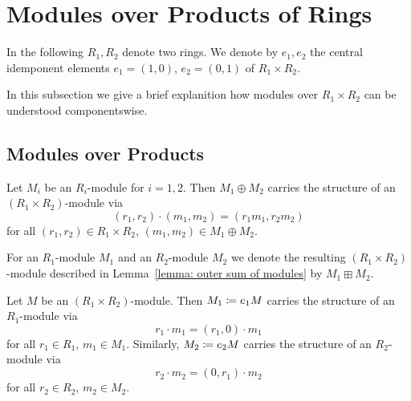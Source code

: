 \section{Modules over Products of Rings}
\label{appendix: modules over products of rings}


\begin{conventions}
  In the following $R_1, R_2$ denote two rings.
  We denote by $e_1, e_2$ the central idemponent elements $e_1 = (1,0)$, $e_2 = (0,1)$ of $R_1 \times R_2$.
\end{conventions}


\begin{fluff}
  In this subsection we give a brief explanition how modules over $R_1 \times R_2$ can be understood componentswise.
\end{fluff}





\subsection{Modules over Products}


\begin{lemma}
  \label{lemma: outer sum of modules}
  Let $M_i$ be an $R_i$-module for $i = 1, 2$.
  Then $M_1 \oplus M_2$ carries the structure of an $(R_1 \times R_2)$-module via
  \[
      (r_1, r_2) \cdot (m_1, m_2)
    = (r_1 m_1, r_2 m_2)
  \]
  for all $(r_1, r_2) \in R_1 \times R_2$, $(m_1, m_2) \in M_1 \oplus M_2$.
\end{lemma}




\begin{definition}
  For an $R_1$-module $M_1$ and an $R_2$-module $M_2$ we denote the resulting $(R_1 \times R_2)$-module described in Lemma~\ref{lemma: outer sum of modules} by $M_1 \boxplus M_2$.
\end{definition}


\begin{lemma}
  \label{lemma: restriction of modules}
  Let $M$ be an $(R_1 \times R_2)$-module.
  Then $M_1 \coloneqq e_1 M$ carries the structure of an $R_1$-module via
  \[
      r_1 \cdot m_1
    = (r_1, 0) \cdot m_1
  \]
  for all $r_1 \in R_1$, $m_1 \in M_1$.
  Similarly, $M_2 \coloneqq e_2 M$ carries the structure of an $R_2$-module via
  \[
      r_2 \cdot m_2
    = (0, r_1) \cdot m_2
  \]
  for all $r_2 \in R_2$, $m_2 \in M_2$.
\end{lemma}


